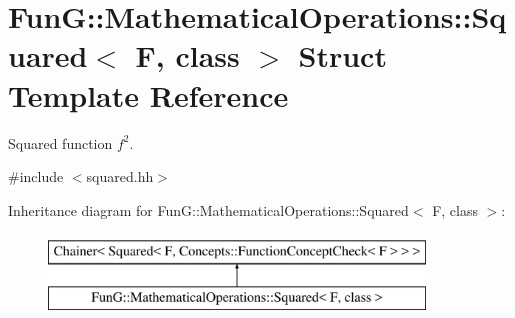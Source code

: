 \hypertarget{structFunG_1_1MathematicalOperations_1_1Squared}{\section{Fun\-G\-:\-:Mathematical\-Operations\-:\-:Squared$<$ F, class $>$ Struct Template Reference}
\label{structFunG_1_1MathematicalOperations_1_1Squared}
}


Squared function $f^2$.  




{\ttfamily \#include $<$squared.\-hh$>$}

Inheritance diagram for Fun\-G\-:\-:Mathematical\-Operations\-:\-:Squared$<$ F, class $>$\-:\begin{figure}[H]
\begin{center}
\leavevmode
\includegraphics[height=2.000000cm]{structFunG_1_1MathematicalOperations_1_1Squared}
\end{center}
\end{figure}
